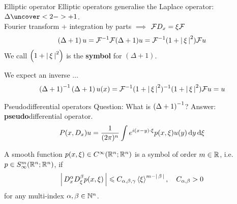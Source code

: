 \documentclass{beamer}
\begin{document}
\begin{frame}{Elliptic operator}
Elliptic operators generalise the Laplace operator: $\Delta \uncover<2->{+1}$. \\
Fourier transform + integration by parts $\implies$ $\F D_x = \xi \F $ 
\begin{align*}
\brac{\Delta + 1} u = \F^{-1} \F (\Delta + 1) u = \F^{-1} (1 + \abs{\xi}^2) \F u 
\end{align*}
We call $\brac{1 + \abs{\xi}^2} $ is the \textbf{symbol} for $(\Delta + 1)$.  

We expect an inverse $\dots$ 
\begin{align*}
\brac{\Delta + 1}^{-1} \brac{\Delta + 1} u(x) = \F^{-1} (1 + \abs{\xi}^2)^{-1} (1 + \abs{\xi}^2) \F u = u 
\end{align*}

\end{frame} 

\begin{frame}{Pseudodifferential operators}
Question: What is $\brac{\Delta + 1}^{-1}$? Answer: \textbf{pseudo}differential operator. 
\begin{align*}
P(x, D_x) u = \frac{1}{(2\pi)^n} \int e^{i(x - y) \cdot \xi} p(x, \xi) u(y) \d[y] \d[\xi]  \label{eq: action of symbol} 
\end{align*}
\begin{definition} A smooth function $p(x, \xi) \in C^\infty(\R^{n}; \R^n)$ is a symbol of order $m \in \R$, i.e. $p \in S^{m}_\infty(\R^{n}; \R^n)$, if
    \begin{align*}
    \abs{D^{\alpha}_x D^\beta_\xi p(x, \xi)} \leq C_{\alpha, \beta, \gamma}  \sym[\xi]^{m - \abs{\beta}}, \quad C_{\alpha, \beta}  > 0
    \end{align*}
    for any multi-index $\alpha, \beta \in \N^n$. \\
    

\end{definition}
\end{frame} 
\end{document}
